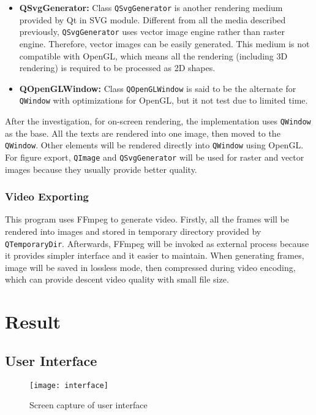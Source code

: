 \begin{itemize}
	\item \textbf{QSvgGenerator:} Class \lstinline{QSvgGenerator} is another rendering medium provided by Qt in SVG module. Different from all the media described previously, \lstinline{QSvgGenerator} uses vector image engine rather than raster engine. Therefore, vector images can be easily generated. This medium is not compatible with OpenGL, which means all the rendering (including 3D rendering) is required to be processed as 2D shapes.
	\item \textbf{QOpenGLWindow:} Class \lstinline{QOpenGLWindow} is said to be the alternate for \lstinline{QWindow} with optimizations for OpenGL, but it not test due to limited time.
\end{itemize}

After the investigation, for on-screen rendering, the implementation uses \lstinline{QWindow} as the base. All the texts are rendered into one image, then moved to the \lstinline{QWindow}. Other elements will be rendered directly into \lstinline{QWindow} using OpenGL. For figure export, \lstinline{QImage} and \lstinline{QSvgGenerator} will be used for raster and vector images because they usually provide better quality.

\subsubsection{Video Exporting}

This program uses FFmpeg to generate video. Firstly, all the frames will be rendered into images and stored in temporary directory provided by \lstinline{QTemporaryDir}. Afterwards, FFmpeg will be invoked as external process because it provides simpler interface and it easier to maintain. When generating frames, image will be saved in lossless mode, then compressed during video encoding, which can provide descent video quality with small file size.

\section{Result}

\subsection{User Interface}

\begin{figure}[!tb]
	\centering
	\texttt{[image: interface]}
	\caption{Screen capture of user interface}
	\label{fig:interface}
\end{figure}

